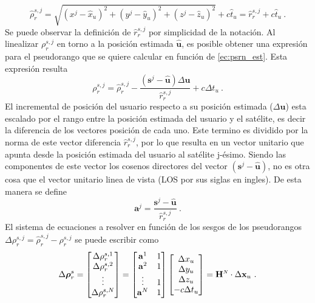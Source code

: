 \documentclass[a4paper,12pt,oneside,onecolumn,final,openright]{book}%
\begin{document}
\begin{equation}\label{ec:psrn_est}
	\hat{\rho}_r^{s,j} = \sqrt{(x^j-\hat{x}_u)^2+(y^j-\hat{y}_u)^2+(z^j-\hat{z}_u)^2} + c\hat{t}_u = \hat{r}_r^{s,j} + c\hat{t}_u \ .
\end{equation}
	Se puede observar la definición de $\hat{r}_r^{s,j}$ por simplicidad de la notación. Al linealizar $\rho_r^{s,j}$ en torno a la posición estimada $\hat{\mathbf{u}}$, es posible obtener una expresión para el pseudorango que se quiere calcular en función de \eqref{ec:psrn_est}. Esta expresión resulta
\begin{equation}
	\rho_r^{s,j} = \hat{\rho}_r^{s,j} - \dfrac{(\mathbf{s}^j - \hat{\mathbf{u}})\Delta \mathbf{u}}{\hat{r}_r^{s,j}} + c\Delta t_u \ .
\end{equation}
	El incremental de posición del usuario respecto a su posición estimada ($\Delta \mathbf{u}$) esta escalado por el rango entre la posición estimada del usuario y el satélite, es decir la diferencia de los vectores posición de cada uno. Este termino es dividido por la norma de este vector diferencia $\hat{r}_r^{s,j}$, por lo que resulta en un vector unitario que apunta desde la posición estimada del usuario al satélite j-ésimo. Siendo las componentes de este vector los cosenos directores del vector $(\mathbf{s}^j - \hat{\mathbf{u}})$, no es otra cosa que el vector unitario linea de vista (LOS por sus siglas en ingles). De esta manera se define
\begin{equation}\label{ec:uLOS}
	\mathbf{a}^j = \dfrac{\mathbf{s}^j-\hat{\mathbf{u}}}{\hat{r}_r^{s,j}} \ .
\end{equation}	
	El sistema de ecuaciones a resolver en función de los sesgos de los pseudorangos $\Delta\rho_r^{s,j} = \hat{\rho}_r^{s,j}-\rho_r^{s,j}$ se puede escribir como
\begin{equation}
	\Delta \boldsymbol{\rho}_r^s = \begin{bmatrix}
\Delta \rho_r^{s,1} \\
\Delta \rho_r^{s,2} \\
\vdots \\
\Delta \rho_r^{s,N} 
\end{bmatrix} = \begin{bmatrix}
\mathbf{a}^1 & 1 \\
\mathbf{a}^2 & 1 \\
\vdots & 1 \\
\mathbf{a}^N & 1 
\end{bmatrix} \begin{bmatrix}
\Delta x_u \\
\Delta y_u \\
\Delta z_u \\
-c\Delta t_u 
\end{bmatrix} = \mathbf{H}^{\scaleto{N}{4pt}}\cdot \Delta \mathbf{x}_u \ .
\end{equation}
\end{document}
